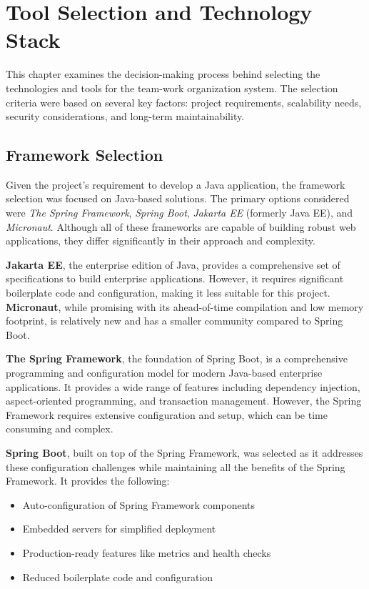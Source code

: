 \section{Tool Selection and Technology Stack}\label{sec:tools}

This chapter examines the decision-making process behind selecting the technologies and tools for the team-work organization system.
The selection criteria were based on several key factors: project requirements, scalability needs, security considerations, and long-term maintainability.

\subsection{Framework Selection}\label{subsec:framework-selection}

Given the project's requirement to develop a Java application, the framework selection was focused on Java-based solutions.
The primary options considered were \textit{The Spring Framework}, \textit{Spring Boot},  \textit{Jakarta EE} (formerly Java EE), and \textit{Micronaut}.
Although all of these frameworks are capable of building robust web applications, they differ significantly in their approach and complexity.

\textbf{Jakarta EE}, the enterprise edition of Java, provides a comprehensive set of specifications to build enterprise applications.
However, it requires significant boilerplate code and configuration, making it less suitable for this project.
\textbf{Micronaut}, while promising with its ahead-of-time compilation and low memory footprint, is relatively new and has a smaller community compared to Spring Boot.

\textbf{The Spring Framework}, the foundation of Spring Boot, is a comprehensive programming and configuration model for modern Java-based enterprise applications.
It provides a wide range of features including dependency injection, aspect-oriented programming, and transaction management.
However, the Spring Framework requires extensive configuration and setup, which can be time consuming and complex.

\textbf{Spring Boot}, built on top of the Spring Framework, was selected as it addresses these configuration challenges while maintaining all the benefits of the Spring Framework.
It provides the following:
\begin{itemize}
    \item Auto-configuration of Spring Framework components
    \item Embedded servers for simplified deployment
    \item Production-ready features like metrics and health checks
    \item Reduced boilerplate code and configuration
\end{itemize}

